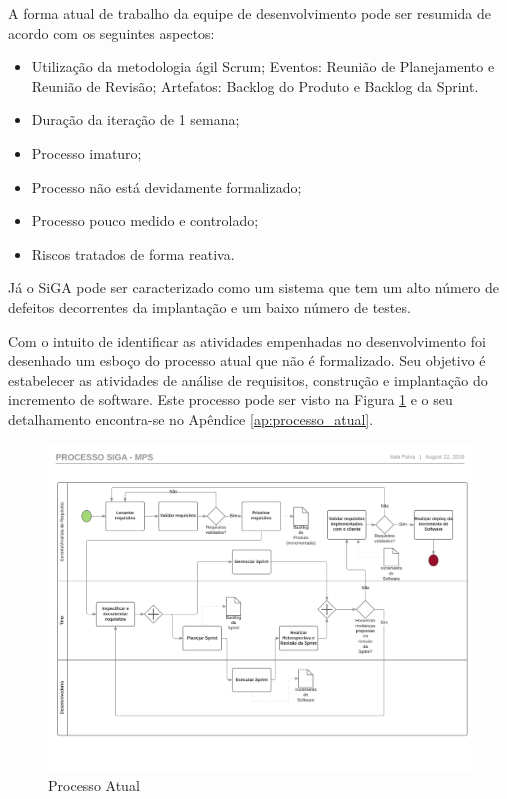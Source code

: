 A forma atual de trabalho da equipe de desenvolvimento pode ser resumida de acordo com os seguintes aspectos:

\begin{itemize}
  \item Utilização da metodologia ágil Scrum;
    \subitem Eventos: Reunião de Planejamento e Reunião de Revisão;
    \subitem Artefatos: Backlog do Produto e Backlog da Sprint.
  \item Duração da iteração de 1 semana;
  \item Processo imaturo;
  \item Processo não está devidamente formalizado;
  \item Processo pouco medido e controlado;
  \item Riscos tratados de forma reativa.
\end{itemize}

Já o SiGA pode ser caracterizado como um sistema que tem um alto número de defeitos decorrentes da implantação e um baixo número de testes.

Com o intuito de identificar as atividades empenhadas no desenvolvimento foi desenhado um esboço do processo atual 
que não é formalizado. Seu objetivo é estabelecer
as atividades de análise de requisitos, construção e implantação do incremento de software. Este processo pode ser visto na 
Figura \ref{fig:processo_atual} e o seu detalhamento encontra-se no Apêndice \ref{ap:processo_atual}.

\begin{figure}[!ht]
\centering
\includegraphics[scale=0.5]{figuras/processo_atual.png}
\caption{Processo Atual}
\label{fig:processo_atual}
\end{figure}



